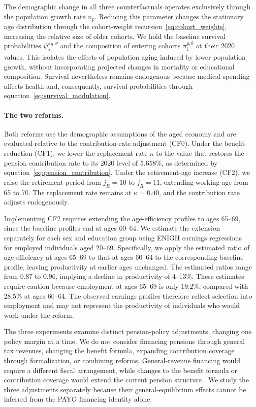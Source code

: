 \documentclass[12pt,a4paper]{article}
\begin{document}
The demographic change in all three counterfactuals operates exclusively through the population growth rate $n_p$. Reducing this parameter changes the stationary age distribution through the cohort-weight recursion~\eqref{eq:cohort_weights}, increasing the relative size of older cohorts. We hold the baseline survival probabilities $\psi^{\circ\,g,\theta}_j$ and the composition of entering cohorts $\pi_1^{g,\theta}$ at their 2020 values. This isolates the effects of population aging induced by lower population growth, without incorporating projected changes in mortality or educational composition. Survival nevertheless remains endogenous because medical spending affects health and, consequently, survival probabilities through equation~\eqref{eq:survival_modulation}.

\paragraph{The two reforms.}
Both reforms use the demographic assumptions of the aged economy and are evaluated relative to the contribution-rate adjustment (CF0). Under the benefit reduction (CF1), we lower the replacement rate $\kappa$ to the value that restores the pension contribution rate to its 2020 level of $5.658\%$, as determined by equation~\eqref{eq:pension_contribution}. Under the retirement-age increase (CF2), we raise the retirement period from $j_R=10$ to $j_R=11$, extending working age from 65 to 70. The replacement rate remains at $\kappa=0.40$, and the contribution rate adjusts endogenously.

Implementing CF2 requires extending the age-efficiency profiles to ages 65--69, since the baseline profiles end at ages 60--64. We estimate the extension separately for each sex and education group using ENIGH earnings regressions for employed individuals aged 20--69. Specifically, we apply the estimated ratio of age-efficiency at ages 65--69 to that at ages 60--64 to the corresponding baseline profile, leaving productivity at earlier ages unchanged. The estimated ratios range from $0.87$ to $0.96$, implying a decline in productivity of $4$--$13\%$. These estimates require caution because employment at ages 65--69 is only $19.2\%$, compared with $28.5\%$ at ages 60--64. The observed earnings profiles therefore reflect selection into employment and may not represent the productivity of individuals who would work under the reform.

The three experiments examine distinct pension-policy adjustments, changing one policy margin at a time. We do not consider financing pensions through general tax revenues, changing the benefit formula, expanding contribution coverage through formalization, or combining reforms. General-revenue financing would require a different fiscal arrangement, while changes to the benefit formula or contribution coverage would extend the current pension structure \citep{Joubert2015}. We study the three adjustments separately because their general-equilibrium effects cannot be inferred from the PAYG financing identity alone.
\end{document}
